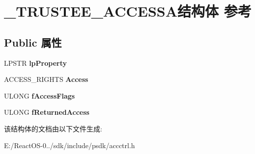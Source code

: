 \hypertarget{struct___t_r_u_s_t_e_e___a_c_c_e_s_s_a}{}\section{\+\_\+\+T\+R\+U\+S\+T\+E\+E\+\_\+\+A\+C\+C\+E\+S\+S\+A结构体 参考}
\label{struct___t_r_u_s_t_e_e___a_c_c_e_s_s_a}
\subsection*{Public 属性}
\begin{DoxyCompactItemize}
\item 
\mbox{\label{struct___t_r_u_s_t_e_e___a_c_c_e_s_s_a_aa0ea6d41c8f8c15ad6654f0a50fcfbec}} 
L\+P\+S\+TR {\bfseries lp\+Property}
\item 
\mbox{\label{struct___t_r_u_s_t_e_e___a_c_c_e_s_s_a_a36690fc22c920ea16ddd20f2a12f2fe5}} 
A\+C\+C\+E\+S\+S\+\_\+\+R\+I\+G\+H\+TS {\bfseries Access}
\item 
\mbox{\label{struct___t_r_u_s_t_e_e___a_c_c_e_s_s_a_a21a4e57cebcd638426604eee4fcb026a}} 
U\+L\+O\+NG {\bfseries f\+Access\+Flags}
\item 
\mbox{\label{struct___t_r_u_s_t_e_e___a_c_c_e_s_s_a_a9b9f50e92b22985950a5987a81fd4e98}} 
U\+L\+O\+NG {\bfseries f\+Returned\+Access}
\end{DoxyCompactItemize}


该结构体的文档由以下文件生成\+:\begin{DoxyCompactItemize}
\item 
E\+:/\+React\+O\+S-\/0../sdk/include/psdk/accctrl.\+h\end{DoxyCompactItemize}
